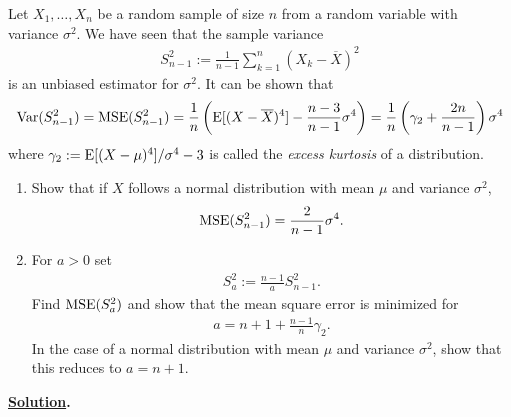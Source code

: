 Let $X_1, \ldots, X_n$ be a random sample of size $n$ from a random variable with variance $\sigma^2$. We have seen that the sample variance
\begin{align*}
S_{n-1}^2 := \frac{1}{n-1} \sum_{k=1}^n (X_k - \overline{X})^2
\end{align*}
is an unbiased estimator for $\sigma^2$. It can be shown that
\begin{align}\label{eq:2}
\mathrm{Var}(S_{n-1}^2) = \mathrm{MSE}(S_{n-1}^2) = \frac{1}{n}\left(\mathrm{E}[(X - \overline{X})^4] - \frac{n-3}{n-1}\sigma^4 \right) = \frac{1}{n}\left(\gamma_2 + \frac{2n}{n-1} \right)\sigma^4
\end{align}
where $\gamma_2 := \mathrm{E}[(X - \mu)^4]/\sigma^4 - 3$ is called the \emph{excess kurtosis} of a distribution.
\begin{enumerate}
	\item Show that if $X$ follows a normal distribution with mean $\mu$ and variance $\sigma^2$,
	\begin{align*}
	\mathrm{MSE}(S_{n-1}^2) = \frac{2}{n-1}\sigma^4.
	\end{align*}
	\item For $a > 0$ set
	\begin{align*}
	S_a^2 := \frac{n-1}{a} S_{n-1}^2.
	\end{align*}
	Find $\mathrm{MSE}(S_a^2)$ and show that the mean square error is minimized for
	\begin{align*}
	a = n + 1 + \frac{n-1}{n}\gamma_2.
	\end{align*}
	In the case of a normal distribution with mean $\mu$ and variance $\sigma^2$, show that this reduces to $a = n + 1$.
\end{enumerate}
\textbf{\underline{Solution}.}
